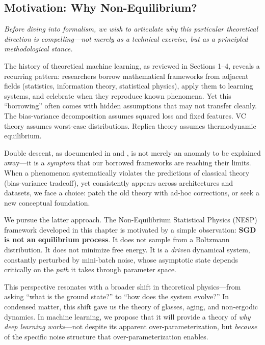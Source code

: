 \documentclass[
  journal=largetwo,
  year=2025,
  volume=37,
]{cup-journal}
\begin{document}
\subsection{Motivation: Why Non-Equilibrium?}

\textit{Before diving into formalism, we wish to articulate why this particular theoretical direction is compelling---not merely as a technical exercise, but as a principled methodological stance.}

The history of theoretical machine learning, as reviewed in Sections 1--4, reveals a recurring pattern: researchers borrow mathematical frameworks from adjacent fields (statistics, information theory, statistical physics), apply them to learning systems, and celebrate when they reproduce known phenomena. Yet this ``borrowing'' often comes with hidden assumptions that may not transfer cleanly. The bias-variance decomposition assumes squared loss and fixed features. VC theory assumes worst-case distributions. Replica theory assumes thermodynamic equilibrium.

Double descent, as documented in \cite{belkin_reconciling_2019} and \cite{nakkiran_deep_2019}, is not merely an anomaly to be explained away---it is a \textit{symptom} that our borrowed frameworks are reaching their limits. When a phenomenon systematically violates the predictions of classical theory (bias-variance tradeoff), yet consistently appears across architectures and datasets, we face a choice: patch the old theory with ad-hoc corrections, or seek a new conceptual foundation.

We pursue the latter approach. The Non-Equilibrium Statistical Physics (NESP) framework developed in this chapter is motivated by a simple observation: \textbf{SGD is not an equilibrium process}. It does not sample from a Boltzmann distribution. It does not minimize free energy. It is a \textit{driven} dynamical system, constantly perturbed by mini-batch noise, whose asymptotic state depends critically on the \textit{path} it takes through parameter space.

This perspective resonates with a broader shift in theoretical physics---from asking ``what is the ground state?'' to ``how does the system evolve?'' In condensed matter, this shift gave us the theory of glasses, aging, and non-ergodic dynamics. In machine learning, we propose that it will provide a theory of \textit{why deep learning works}---not despite its apparent over-parameterization, but \textit{because} of the specific noise structure that over-parameterization enables.
\end{document}
